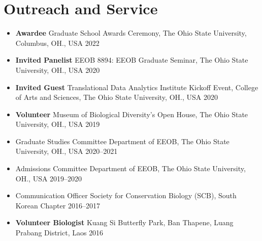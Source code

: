 \documentclass[11pt,letterpaper,sans]{moderncv} %
\begin{document}
\section{Outreach and Service}
\begin{itemize}




	\item \textbf{Awardee} Graduate School Awards Ceremony, The Ohio State University, Columbus, OH., USA \hfill{2022}
	
	\item \textbf{Invited Panelist} EEOB 8894: EEOB Graduate Seminar, The Ohio State University, OH., USA  \hfill{2020}
	
	\item \textbf{Invited Guest} Translational Data Analytics Institute Kickoff Event, College of Arts and Sciences, The Ohio State University, OH., USA \hfill{2020}

	\item \textbf{Volunteer} Museum of Biological Diversity’s Open House, The Ohio State University, OH., USA \hfill{2019}

	\item Graduate Studies Committee Department of EEOB, The Ohio State University, OH., USA \hfill{2020--2021}

	\item Admissions Committee Department of EEOB, The Ohio State University, OH., USA \hfill{2019--2020}

	\item Communication Officer Society for Conservation Biology (SCB), South Korean Chapter \hfill{2016--2017}
	
	\item \textbf{Volunteer Biologist} Kuang Si Butterfly Park, Ban Thapene, Luang Prabang District, Laos \hfill{2016}
\end{itemize}
\end{document}

